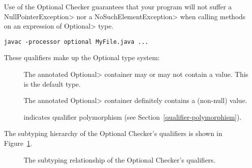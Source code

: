 Use of the Optional Checker guarantees that your program will not suffer a
\<NullPointerException> nor a \<NoSuchElementException> when calling
methods on an expression of \<Optional> type.



\begin{Verbatim}
javac -processor optional MyFile.java ...
\end{Verbatim}



These qualifiers make up the Optional type system:

\begin{description}

\item[]
  The annotated \<Optional> container may or may not contain a value.
  This is the default type.

\item[]
  The annotated \<Optional> container definitely contains a (non-null) value.

\item[]
  indicates qualifier polymorphism (see Section~\ref{qualifier-polymorphism}).

\end{description}

The subtyping hierarchy of the Optional Checker's qualifiers is shown in
Figure~\ref{fig-optional-hierarchy}.

\begin{figure}
\caption{The subtyping relationship of the Optional Checker's qualifiers.}
\label{fig-optional-hierarchy}
\end{figure}

